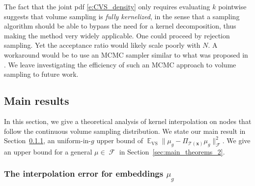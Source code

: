 \documentclass[twoside,11pt]{book}
\numberwithin{theorem}{chapter}
\numberwithin{definition}{chapter}
\numberwithin{proposition}{chapter}
\numberwithin{corollary}{chapter}
\numberwithin{example}{chapter}
\numberwithin{lemma}{chapter}
\DeclareMathOperator{\VS}{\mathrm{VS}}
\DeclareMathOperator{\EX}{\mathbb{E}}
\DeclareMathOperator{\F}{\mathcal{F}}
\DeclareMathOperator{\Ltwo}{\mathbb{L}_{2}(\mathrm{d} \omega)}
\newcommand{\pc}[1]{\textcolor{blue}{#1}}
\begin{document}
The fact that the joint pdf \eqref{e:CVS_density} only requires evaluating $k$ pointwise suggests that volume sampling is \emph{fully kernelized}, in the sense that a sampling algorithm should be able to bypass the need for a kernel decomposition, thus making the method very widely applicable.
One could proceed by rejection sampling. Yet the acceptance ratio would likely scale poorly with $N$.  A workaround would be to use an MCMC sampler similar to what was proposed in \citep{ReGh19}. We leave investigating the efficiency of such an MCMC approach to volume sampling to future work.



\subsection{Main results}\label{sec:main_results}
In this section, we give a theoretical analysis of kernel interpolation on nodes that follow the continuous volume sampling distribution. We state our main result in Section~\ref{sec:main_theorems}, an uniform-in-$g$ upper bound of $\EX_{\VS} \|\mu_{g} - \Pi_{\mathcal{T}(\bm{x})} \mu_{g}\|_{\F}^{2}$. We give an upper bound for a general $\mu \in \F$ in Section~\ref{sec:main_theorems_2}.





\subsubsection{The interpolation error for embeddings $\mu_{g}$}\label{sec:main_theorems}
%
%
\end{document}
